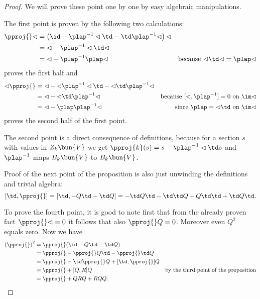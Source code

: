 \begin{proof}
We will prove these point one by one by easy algebraic manipulations.

The first point is proven by the following two calculations:
\begin{align*}
  \pproj{}\lhd & = \left( \id-\plap^{-1}\lhd\td - \td\plap^{-1}\lhd \right)\lhd &\\
		& = \lhd - \plap^{-1}\lhd\td\lhd &\\
		& = \lhd - \plap^{-1} \plap\lhd & \text{because $\lhd\td\lhd=\plap\lhd$}
\end{align*}
proves the first half and
\begin{align*}
  \lhd \pproj{} & = \lhd -\lhd\plap^{-1}\lhd\td - \lhd\td\plap^{-1}\lhd & \\
		& = \lhd -\lhd\td\plap^{-1}\lhd &\text{because $[\lhd,\plap^{-1}]=0$ on $\im \lhd$}\\
		& = \lhd - \plap\plap^{-1}\lhd &\text{since $\plap = \lhd\td$ on $\im \lhd$}
\end{align*}
proves the second half of the first point.

The second point is a direct consequence of definitions, because for a section $s$ with values in $Z_k\bun{V}$ we get $\pproj{k}(s)=s - \plap^{-1}\lhd\td s$ and $\plap^{-1}$ maps $B_k\bun{V}$ to $B_k\bun{V}$.

Proof of the next point of the proposition is also just unwinding the definitions and trivial algebra:
\[
 [\td,\pproj{}]  = [\td,-Q\td - \td Q] = -\td Q \td - \td\td Q + Q \td \td +\td Q \td.
\]

To prove the fourth point, it is good to note first that from the already proven fact $\pproj{} \lhd = 0$ it follows that also $\pproj{} Q = 0$. Moreover even $Q^2$ equals zero. Now we have
\begin{align*}
 \left(\pproj{} \right)^2 & = \pproj{}(\id - Q\td -\td Q) & \\
			  & = \pproj{} - \pproj{}Q\td - \pproj{} \td Q & \\
			  & = \pproj{} -\td \pproj{} Q + [\td,\pproj{}]Q &\\
			  & = \pproj{} + [Q,R]Q &\text{by the third point of the proposition}\\
			  & = \pproj{} + QRQ+RQQ.
\end{align*}


\end{proof}
